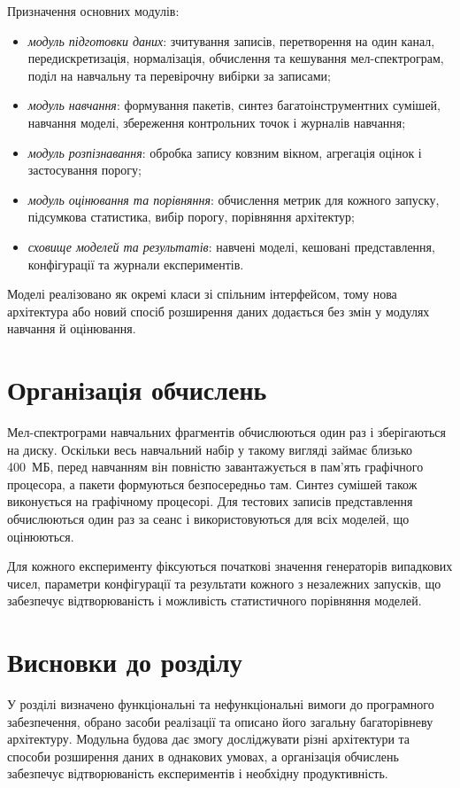Призначення основних модулів:
\begin{itemize}
    \item \textit{модуль підготовки даних}: зчитування записів,
    перетворення на один канал, передискретизація, нормалізація,
    обчислення та кешування мел-спектрограм, поділ на навчальну та
    перевірочну вибірки за записами;
    \item \textit{модуль навчання}: формування пакетів, синтез
    багатоінструментних сумішей, навчання моделі, збереження контрольних
    точок і журналів навчання;
    \item \textit{модуль розпізнавання}: обробка запису ковзним вікном,
    агрегація оцінок і застосування порогу;
    \item \textit{модуль оцінювання та порівняння}: обчислення метрик
    для кожного запуску, підсумкова статистика, вибір порогу, порівняння
    архітектур;
    \item \textit{сховище моделей та результатів}: навчені моделі,
    кешовані представлення, конфігурації та журнали експериментів.
\end{itemize}

Моделі реалізовано як окремі класи зі спільним інтерфейсом, тому нова
архітектура або новий спосіб розширення даних додається без змін у
модулях навчання й оцінювання.

\section{Організація обчислень}
\label{sec:sw_compute}

Мел-спектрограми навчальних фрагментів обчислюються один раз і
зберігаються на диску. Оскільки весь навчальний набір у такому вигляді
займає близько 400~МБ, перед навчанням він повністю завантажується в
пам'ять графічного процесора, а пакети формуються безпосередньо там. Синтез
сумішей також виконується на графічному процесорі. Для тестових записів
представлення обчислюються один раз за сеанс і використовуються для всіх
моделей, що оцінюються.

Для кожного експерименту фіксуються початкові значення генераторів
випадкових чисел, параметри конфігурації та результати кожного з
незалежних запусків, що забезпечує відтворюваність і можливість
статистичного порівняння моделей.

\section{Висновки до розділу}
\label{sec:ch3_conclusions}

У розділі визначено функціональні та нефункціональні вимоги до
програмного забезпечення, обрано засоби реалізації та описано його
загальну багаторівневу архітектуру. Модульна будова дає змогу
досліджувати різні архітектури та способи розширення даних в однакових
умовах, а організація обчислень забезпечує відтворюваність експериментів
і необхідну продуктивність.
